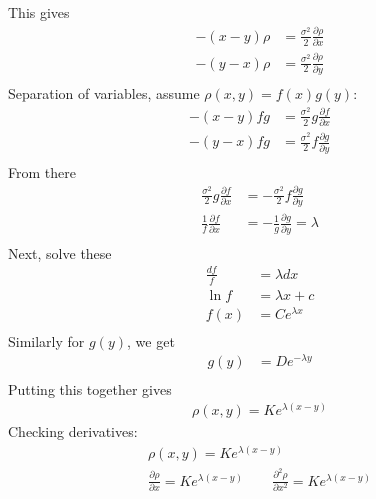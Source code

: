 \documentclass[12pt]{article}
\theoremstyle{plain}
\theoremstyle{definition}
\theoremstyle{remark}
\begin{document}
\begin{enumerate}
\begin{enumerate}
\begin{align*}
          \\
        \end{align*}
        This gives
        \begin{align*}
          -(x-y)\rho &= \frac{\sigma^2 }{2}
            \frac{\partial \rho}{\partial x} \\
          -(y-x)\rho &= \frac{\sigma^2 }{2}
            \frac{\partial \rho}{\partial y} \\
        \end{align*}
        Separation of variables, assume $\rho(x,y) = f(x) g(y)$:
        \begin{align*}
          -(x-y)fg &= \frac{\sigma^2 }{2}
          g \frac{\partial f}{\partial x}\\
          -(y-x)fg &= \frac{\sigma^2 }{2}
            f \frac{\partial g}{\partial y} \\
        \end{align*}
        From there
        \begin{align*}
          \frac{\sigma^2 }{2} g \frac{\partial f}{\partial x}
            &= -\frac{\sigma^2 }{2} f \frac{\partial g}{\partial y} \\
          \frac{1}{f}\frac{\partial f}{\partial x}
            &= -\frac{1}{g} \frac{\partial g}{\partial y}
            = \lambda \\
        \end{align*}
        Next, solve these
        \begin{align*}
          \frac{d f}{f} &= \lambda dx\\
          \ln f &= \lambda x + c\\
          f(x) &= Ce^{\lambda x}\\
        \end{align*}
        Similarly for $g(y)$, we get
        \begin{align*}
          g(y) &= De^{-\lambda y}\\
        \end{align*}
        Putting this together gives
        \begin{align*}
          \rho(x,y) = K e^{\lambda (x-y)}
        \end{align*}
        Checking derivatives:
        \begin{align*}
          \rho(x,y) = K e^{\lambda (x-y)}\\
          \frac{\partial \rho}{\partial x} = K e^{\lambda (x-y)}
          \qquad
          \frac{\partial^2 \rho}{\partial x^2} = K e^{\lambda (x-y)}\\

\end{align*}
\end{enumerate}
\end{enumerate}
\end{document}
